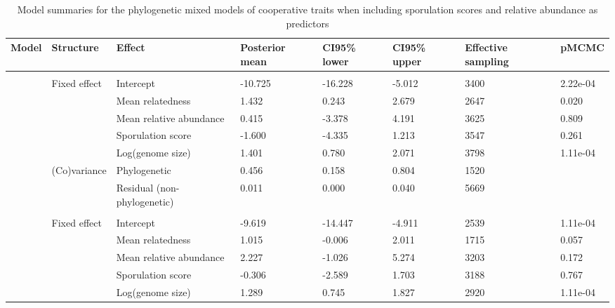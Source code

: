 \begin{table}

\caption{\label{tab:}Model summaries for the phylogenetic mixed models of cooperative traits when including sporulation scores and relative abundance as predictors}
\centering
\begin{tabular}[t]{llllllll}
\toprule
Model & Structure & Effect & Posterior
 mean & CI95\% lower & CI95\% upper & Effective
 sampling & pMCMC\\
\midrule
\addlinespace[0.3em]
\multicolumn{8}{l}{\textbf{Siderophores}}\\
\hspace{1em} & Fixed effect & Intercept & -10.725 & -16.228 & -5.012 & 3400 & 2.22e-04\\
\hspace{1em} &  & Mean relatedness & 1.432 & 0.243 & 2.679 & 2647 & 0.020\\
\hspace{1em} &  & Mean relative abundance & 0.415 & -3.378 & 4.191 & 3625 & 0.809\\
\hspace{1em} &  & Sporulation score & -1.600 & -4.335 & 1.213 & 3547 & 0.261\\
\hspace{1em} &  & Log(genome size) & 1.401 & 0.780 & 2.071 & 3798 & 1.11e-04\\
\hspace{1em} & (Co)variance & Phylogenetic & 0.456 & 0.158 & 0.804 & 1520 & \\
\hspace{1em} &  & Residual (non-phylogenetic) & 0.011 & 0.000 & 0.040 & 5669 & \\
\addlinespace[0.3em]
\multicolumn{8}{l}{\textbf{Biofilm}}\\
\hspace{1em} & Fixed effect & Intercept & -9.619 & -14.447 & -4.911 & 2539 & 1.11e-04\\
\hspace{1em} &  & Mean relatedness & 1.015 & -0.006 & 2.011 & 1715 & 0.057\\
\hspace{1em} &  & Mean relative abundance & 2.227 & -1.026 & 5.274 & 3203 & 0.172\\
\hspace{1em} &  & Sporulation score & -0.306 & -2.589 & 1.703 & 3188 & 0.767\\
\hspace{1em} &  & Log(genome size) & 1.289 & 0.745 & 1.827 & 2920 & 1.11e-04\\

\end{tabular}
\end{table}

